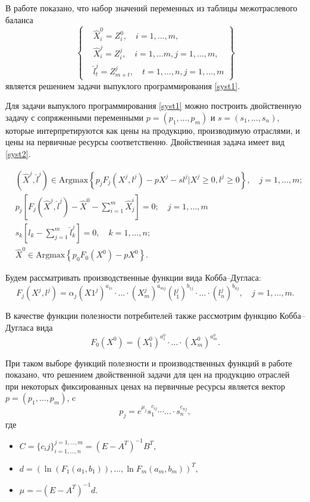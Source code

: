 \documentclass[12pt, a4paper]{article}
\begin{document}
В работе 
\cite{InverseShan} 
показано, что набор значений переменных из таблицы межотраслевого баланса 
$$
\left\{
\begin{aligned}
&\hat{X}_i^0 = Z_i^0,\quad i = 1,\ldots, m,\\
&\hat{X}_i^j = Z_i^j,\quad i = 1,\ldots m, j=1,\ldots,m,\\
&\hat{l}_t^j = Z_{m+t}^j, \quad t = 1, \ldots, n, j = 1,\ldots, m
\end{aligned}
\right\}
$$
является решением задачи выпуклого программирования \eqref{syst1}.

Для задачи выпуклого программирования \eqref{syst1} можно построить двойственную задачу с сопряженными переменными $p = (p_1, \ldots, p_m)$ и $s = (s_1, \ldots, s_n)$, которые интерпретируются как цены на продукцию, производимую отраслями, и цены на первичные ресурсы соответственно. Двойственная задача имеет вид \eqref{syst2}.

\begin{equation}\label{syst2}
\begin{aligned}
&(\hat{X}^j, \hat{l}^j) \in \text{Argmax}\left\{p_jF_j(X^j, l^j) - p X^j - sl^j \Biggl|X^j \geq 0, l^j \geq 0\right\},\quad j = 1,\ldots, m;\\
&p_j\left[F_j(\hat{X}^j, \hat{l}^j) - \hat{X}^0 - \sum\limits_{i=1}^{m}\hat{X}^i_j\right] = 0;\quad j=1,\ldots, m\\
&s_k\left[l_k - \sum\limits_{j=1}^m \hat{l}^j_k\right] = 0,\quad k = 1,\ldots,n;\\
&\hat{X}^0 \in \text{Argmax}\left\{p_0F_0(X^0) - pX^0\right\}.
\end{aligned}
\end{equation}

Будем рассматривать производственные функции вида Кобба--Дугласа:
$$
F_j(X^j, l^j) = \alpha_j (X1^j)^{a_{1i}}\cdot \ldots \cdot (X_m^j)^{a_{mj}}(l_1^j)^{b_{1j}}\cdot \ldots \cdot (l_n^j)^{b_{nj}}, \quad j = 1, \ldots, m.
$$

В качестве функции полезности потребителей также рассмотрим функцию Кобба--Дугласа вида 
$$
F_0(X^0) = (X^0_1)^{a_1^0}\cdot \ldots \cdot (X_m^0)^{a^0_m}.
$$

При таком выборе функций полезности и производственных функций в работе 
\cite{InverseShan} 
показано, что решением двойственной задачи для цен на продукцию отраслей при некоторых фиксированных ценах на первичные ресурсы является вектор $p = (p_1, \ldots, p_m)$, c
$$
p_j = e^{\mu_j} s_1^{c_{ij}}\cdots \ldots \cdot s_n^{c_{nj}},
$$
где\begin{itemize}
\item $C = \{c_ij\}_{i = 1,\ldots,n}^{j = 1, \ldots, m} = (E - A^T)^{-1}B^T,$ 
\item $d = (\ln(F_1(a_1, b_1)), \ldots, \ln F_m(a_m, b_m))^T,$
\item $\mu = -(E - A^T)^{-1}d$.
\end{itemize} 
\end{document}
